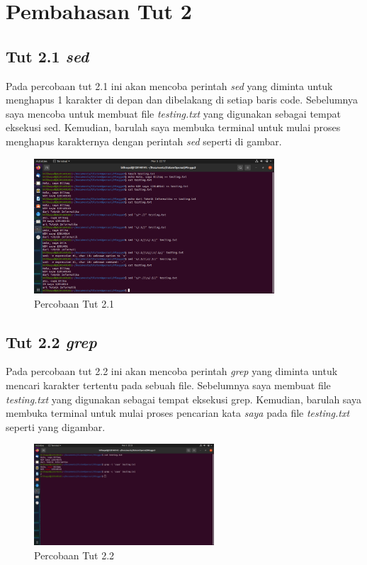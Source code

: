 \documentclass[11pt,a4paper]{article}
\begin{document}
\newpage
\section{Pembahasan Tut 2}
\subsection{Tut 2.1 \textit{sed}}
	Pada percobaan tut 2.1 ini akan mencoba perintah \textit{sed} yang diminta untuk menghapus 1 karakter di depan dan dibelakang
	di setiap baris code. Sebelumnya saya mencoba untuk membuat file \textit{testing.txt} yang digunakan sebagai tempat eksekusi sed.
	Kemudian, barulah saya membuka terminal untuk mulai proses menghapus karakternya dengan perintah \textit{sed} seperti di gambar.
	\begin{figure}[h]
		\centering
		\includegraphics[width=0.8\textwidth]{Figure/tut 2.1.png}
		\caption{Percobaan Tut 2.1}
	\end{figure}

\subsection{Tut 2.2 \textit{grep}}
	Pada percobaan tut 2.2 ini akan mencoba perintah \textit{grep} yang diminta untuk mencari karakter tertentu pada sebuah file.
	Sebelumnya saya membuat file \textit{testing.txt} yang digunakan sebagai tempat eksekusi grep. Kemudian, barulah saya membuka terminal 
	untuk mulai proses pencarian kata \textit{saya} pada file \textit{testing.txt} seperti yang digambar.
	\begin{figure}[h]
		\centering
		\includegraphics[width=0.6\textwidth]{Figure/tut 2.2.png}
		\caption{Percobaan Tut 2.2}
	\end{figure}
\end{document}
